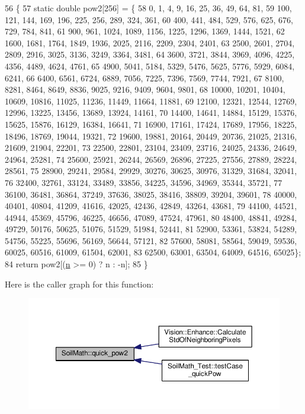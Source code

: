 \begin{DoxyCode}
56                                        \{
57   \textcolor{keyword}{static} \textcolor{keywordtype}{double} pow2[256] = \{
58       0,     1,     4,     9,     16,    25,    36,    49,    64,    81,
59       100,   121,   144,   169,   196,   225,   256,   289,   324,   361,
60       400,   441,   484,   529,   576,   625,   676,   729,   784,   841,
61       900,   961,   1024,  1089,  1156,  1225,  1296,  1369,  1444,  1521,
62       1600,  1681,  1764,  1849,  1936,  2025,  2116,  2209,  2304,  2401,
63       2500,  2601,  2704,  2809,  2916,  3025,  3136,  3249,  3364,  3481,
64       3600,  3721,  3844,  3969,  4096,  4225,  4356,  4489,  4624,  4761,
65       4900,  5041,  5184,  5329,  5476,  5625,  5776,  5929,  6084,  6241,
66       6400,  6561,  6724,  6889,  7056,  7225,  7396,  7569,  7744,  7921,
67       8100,  8281,  8464,  8649,  8836,  9025,  9216,  9409,  9604,  9801,
68       10000, 10201, 10404, 10609, 10816, 11025, 11236, 11449, 11664, 11881,
69       12100, 12321, 12544, 12769, 12996, 13225, 13456, 13689, 13924, 14161,
70       14400, 14641, 14884, 15129, 15376, 15625, 15876, 16129, 16384, 16641,
71       16900, 17161, 17424, 17689, 17956, 18225, 18496, 18769, 19044, 19321,
72       19600, 19881, 20164, 20449, 20736, 21025, 21316, 21609, 21904, 22201,
73       22500, 22801, 23104, 23409, 23716, 24025, 24336, 24649, 24964, 25281,
74       25600, 25921, 26244, 26569, 26896, 27225, 27556, 27889, 28224, 28561,
75       28900, 29241, 29584, 29929, 30276, 30625, 30976, 31329, 31684, 32041,
76       32400, 32761, 33124, 33489, 33856, 34225, 34596, 34969, 35344, 35721,
77       36100, 36481, 36864, 37249, 37636, 38025, 38416, 38809, 39204, 39601,
78       40000, 40401, 40804, 41209, 41616, 42025, 42436, 42849, 43264, 43681,
79       44100, 44521, 44944, 45369, 45796, 46225, 46656, 47089, 47524, 47961,
80       48400, 48841, 49284, 49729, 50176, 50625, 51076, 51529, 51984, 52441,
81       52900, 53361, 53824, 54289, 54756, 55225, 55696, 56169, 56644, 57121,
82       57600, 58081, 58564, 59049, 59536, 60025, 60516, 61009, 61504, 62001,
83       62500, 63001, 63504, 64009, 64516, 65025\};
84   \textcolor{keywordflow}{return} pow2[(\hyperlink{_comparision_pictures_2_createtest_image_8m_aeab71244afb687f16d8c4f5ee9d6ef0e}{n} >= 0) ? n : -n];
85 \}
\end{DoxyCode}


Here is the caller graph for this function\+:\nopagebreak
\begin{figure}[H]
\begin{center}
\leavevmode
\includegraphics[width=350pt]{namespace_soil_math_a69d186af0e164a5f98c42985aabec919_icgraph}
\end{center}
\end{figure}


